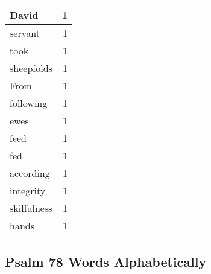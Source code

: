 \begin{center}
\begin{longtable}{l|r}
David & 1\\ \hline 
servant & 1\\ \hline 
took & 1\\ \hline 
sheepfolds & 1\\ \hline 
From & 1\\ \hline 
following & 1\\ \hline 
ewes & 1\\ \hline 
feed & 1\\ \hline 
fed & 1\\ \hline 
according & 1\\ \hline 
integrity & 1\\ \hline 
skilfulness & 1\\ \hline 
hands & 1\\ \hline 
\end{longtable}
\end{center}





\subsection{Psalm 78 Words Alphabetically}


\normalsize
 
